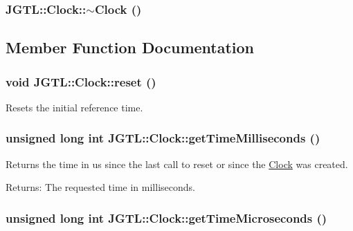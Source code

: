 \hypertarget{class_j_g_t_l_1_1_clock_acafb81561e1443d61ca479a68958ba6}{
\subsubsection[$\sim$Clock]{\setlength{\rightskip}{0pt plus 5cm}JGTL::Clock::$\sim$Clock ()}}
\label{class_j_g_t_l_1_1_clock_acafb81561e1443d61ca479a68958ba6}




\subsection{Member Function Documentation}
\hypertarget{class_j_g_t_l_1_1_clock_3a08f80094f489adc52bf1f2ca92ded6}{
\subsubsection[reset]{\setlength{\rightskip}{0pt plus 5cm}void JGTL::Clock::reset ()}}
\label{class_j_g_t_l_1_1_clock_3a08f80094f489adc52bf1f2ca92ded6}


Resets the initial reference time. \hypertarget{class_j_g_t_l_1_1_clock_a0719596dc560b7a09304f939bcb1577}{
\subsubsection[getTimeMilliseconds]{\setlength{\rightskip}{0pt plus 5cm}unsigned long int JGTL::Clock::get\-Time\-Milliseconds ()}}
\label{class_j_g_t_l_1_1_clock_a0719596dc560b7a09304f939bcb1577}


Returns the time in us since the last call to reset or since the \hyperlink{class_j_g_t_l_1_1_clock}{Clock} was created.

\begin{Desc}
\item[Returns:]The requested time in milliseconds. \end{Desc}
\hypertarget{class_j_g_t_l_1_1_clock_d7b56e96fa0b80d1fa8bc98de34e5c4a}{
\subsubsection[getTimeMicroseconds]{\setlength{\rightskip}{0pt plus 5cm}unsigned long int JGTL::Clock::get\-Time\-Microseconds ()}}
\label{class_j_g_t_l_1_1_clock_d7b56e96fa0b80d1fa8bc98de34e5c4a}


